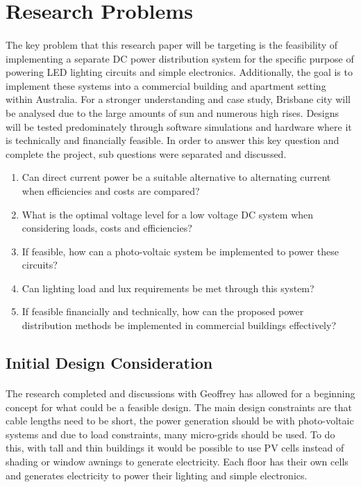 
\section{Research Problems}

\paragraph{}
The key problem that this research paper will be targeting is the feasibility of implementing a separate DC power distribution system for the specific purpose of powering LED lighting circuits and simple electronics. Additionally, the goal is to implement these systems into a commercial building and apartment setting within Australia. For a stronger understanding and case study, Brisbane city will be analysed due to the large amounts of sun and numerous high rises. Designs will be tested predominately through software simulations and hardware where it is technically and financially feasible. In order to answer this key question and complete the project, sub questions were separated and discussed.

\begin{enumerate}
\itemsep-0.5em 
\item Can direct current power be a suitable alternative to alternating current when efficiencies and costs are compared?
\item What is the optimal voltage level for a low voltage DC system when considering loads, costs and efficiencies?
\item If feasible, how can a photo-voltaic system be implemented to power these circuits?
\item Can lighting load and lux requirements be met through this system?
\item If feasible financially and technically, how can the proposed power distribution methods be implemented in commercial buildings effectively?
\end{enumerate} 

\subsection{Initial Design Consideration}

\paragraph{}
The research completed and discussions with Geoffrey has allowed for a beginning concept for what could be a feasible design. The main design constraints are that cable lengths need to be short, the power generation should be with photo-voltaic systems and due to load constraints, many micro-grids should be used. To do this, with tall and thin buildings it would be possible to use PV cells instead of shading or window awnings to generate electricity. Each floor has their own cells and generates electricity to power their lighting and simple electronics. 

